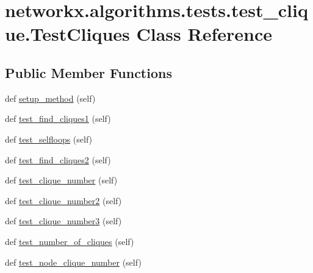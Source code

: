 \hypertarget{classnetworkx_1_1algorithms_1_1tests_1_1test__clique_1_1TestCliques}{}\section{networkx.\+algorithms.\+tests.\+test\+\_\+clique.\+Test\+Cliques Class Reference}
\label{classnetworkx_1_1algorithms_1_1tests_1_1test__clique_1_1TestCliques}
\subsection*{Public Member Functions}
\begin{DoxyCompactItemize}
\item 
def \hyperlink{classnetworkx_1_1algorithms_1_1tests_1_1test__clique_1_1TestCliques_ae0acf44c86d20f5071212d8b2c53f48d}{setup\+\_\+method} (self)
\item 
def \hyperlink{classnetworkx_1_1algorithms_1_1tests_1_1test__clique_1_1TestCliques_a81804bb70f18fecea28a657f47e4ce64}{test\+\_\+find\+\_\+cliques1} (self)
\item 
def \hyperlink{classnetworkx_1_1algorithms_1_1tests_1_1test__clique_1_1TestCliques_a99ec447ecad793d22062e95fd992b205}{test\+\_\+selfloops} (self)
\item 
def \hyperlink{classnetworkx_1_1algorithms_1_1tests_1_1test__clique_1_1TestCliques_adf3de9a2262c36b165e1d15c7a8d82fb}{test\+\_\+find\+\_\+cliques2} (self)
\item 
def \hyperlink{classnetworkx_1_1algorithms_1_1tests_1_1test__clique_1_1TestCliques_a46feb6cfc708d96249550643f3426ff1}{test\+\_\+clique\+\_\+number} (self)
\item 
def \hyperlink{classnetworkx_1_1algorithms_1_1tests_1_1test__clique_1_1TestCliques_afb7bb8fb587cf3a17b0d30c1ff0ff2f0}{test\+\_\+clique\+\_\+number2} (self)
\item 
def \hyperlink{classnetworkx_1_1algorithms_1_1tests_1_1test__clique_1_1TestCliques_aa6052b799ea2cf5ae3bda5f188f0740c}{test\+\_\+clique\+\_\+number3} (self)
\item 
def \hyperlink{classnetworkx_1_1algorithms_1_1tests_1_1test__clique_1_1TestCliques_a17b482712f1512ba516214e89d9f5523}{test\+\_\+number\+\_\+of\+\_\+cliques} (self)
\item 
def \hyperlink{classnetworkx_1_1algorithms_1_1tests_1_1test__clique_1_1TestCliques_a9a108b7895a6153c5550b59a096bd6fc}{test\+\_\+node\+\_\+clique\+\_\+number} (self)

\end{DoxyCompactItemize}
